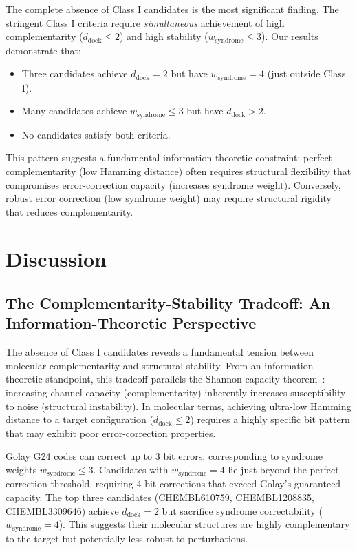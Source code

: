 \documentclass[12pt,a4paper]{article}
\begin{document}
The complete absence of Class I candidates is the most significant finding. The stringent Class I criteria require \textit{simultaneous} achievement of high complementarity ($d_{\text{dock}} \leq 2$) and high stability ($w_{\text{syndrome}} \leq 3$). Our results demonstrate that:

\begin{itemize}
\item Three candidates achieve $d_{\text{dock}} = 2$ but have $w_{\text{syndrome}} = 4$ (just outside Class I).
\item Many candidates achieve $w_{\text{syndrome}} \leq 3$ but have $d_{\text{dock}} > 2$.
\item No candidates satisfy both criteria.
\end{itemize}

This pattern suggests a fundamental information-theoretic constraint: perfect complementarity (low Hamming distance) often requires structural flexibility that compromises error-correction capacity (increases syndrome weight). Conversely, robust error correction (low syndrome weight) may require structural rigidity that reduces complementarity.

\section{Discussion}

\subsection{The Complementarity-Stability Tradeoff: An Information-Theoretic Perspective}

The absence of Class I candidates reveals a fundamental tension between molecular complementarity and structural stability. From an information-theoretic standpoint, this tradeoff parallels the Shannon capacity theorem~\cite{Shannon1948}: increasing channel capacity (complementarity) inherently increases susceptibility to noise (structural instability). In molecular terms, achieving ultra-low Hamming distance to a target configuration ($d_{\text{dock}} \leq 2$) requires a highly specific bit pattern that may exhibit poor error-correction properties.

Golay G24 codes can correct up to 3 bit errors, corresponding to syndrome weights $w_{\text{syndrome}} \leq 3$. Candidates with $w_{\text{syndrome}} = 4$ lie just beyond the perfect correction threshold, requiring 4-bit corrections that exceed Golay's guaranteed capacity. The top three candidates (CHEMBL610759, CHEMBL1208835, CHEMBL3309646) achieve $d_{\text{dock}} = 2$ but sacrifice syndrome correctability ($w_{\text{syndrome}} = 4$). This suggests their molecular structures are highly complementary to the target but potentially less robust to perturbations.
\end{document}
